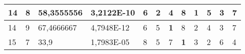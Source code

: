 \documentclass[conference]{IEEEtran}
\begin{document}
\begin{table*}[]
\begin{tabular}{|llll|llllllll|}
\multicolumn{1}{|l|}{14}                                                    & \multicolumn{1}{l|}{8}                                                        & \multicolumn{1}{l|}{58,3555556}                                                   & 3,2122E-10                     & \multicolumn{1}{l|}{6}                                                  & \multicolumn{1}{l|}{2}                                                  & \multicolumn{1}{l|}{4}                                                  & \multicolumn{1}{l|}{8}                                                  & \multicolumn{1}{l|}{\textbf{1}}                                         & \multicolumn{1}{l|}{5}                                                  & \multicolumn{1}{l|}{3}                                                  & 7                          \\ \hline
\multicolumn{1}{|l|}{14}                                                    & \multicolumn{1}{l|}{9}                                                        & \multicolumn{1}{l|}{67,4666667}                                                   & 4,7948E-12                     & \multicolumn{1}{l|}{6}                                                  & \multicolumn{1}{l|}{5}                                                  & \multicolumn{1}{l|}{\textbf{1}}                                         & \multicolumn{1}{l|}{8}                                                  & \multicolumn{1}{l|}{2}                                                  & \multicolumn{1}{l|}{4}                                                  & \multicolumn{1}{l|}{3}                                                  & 7                          \\ \hline
\multicolumn{1}{|l|}{15}                                                    & \multicolumn{1}{l|}{7}                                                        & \multicolumn{1}{l|}{33,9}                                                         & 1,7983E-05                     & \multicolumn{1}{l|}{8}                                                  & \multicolumn{1}{l|}{5}                                                  & \multicolumn{1}{l|}{7}                                                  & \multicolumn{1}{l|}{\textbf{1}}                                         & \multicolumn{1}{l|}{3}                                                  & \multicolumn{1}{l|}{2}                                                  & \multicolumn{1}{l|}{6}                                                  & 4                          \\ \hline

\end{tabular}
\end{table*}
\end{document}
